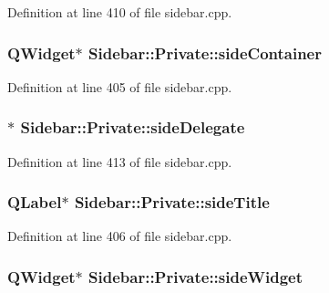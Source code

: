 Definition at line 410 of file sidebar.\+cpp.

\hypertarget{classSidebar_1_1Private_a2a3136a30630243128369d98c44b1823}{
\subsubsection[{side\+Container}]{\setlength{\rightskip}{0pt plus 5cm}Q\+Widget$\ast$ Sidebar\+::\+Private\+::side\+Container}}\label{classSidebar_1_1Private_a2a3136a30630243128369d98c44b1823}


Definition at line 405 of file sidebar.\+cpp.

\hypertarget{classSidebar_1_1Private_a25b75ddd6cbb379f77f71207ad627d54}{
\subsubsection[{side\+Delegate}]{$\ast$ Sidebar\+::\+Private\+::side\+Delegate}}\label{classSidebar_1_1Private_a25b75ddd6cbb379f77f71207ad627d54}


Definition at line 413 of file sidebar.\+cpp.

\hypertarget{classSidebar_1_1Private_a37b19515edf372e8581845c398549122}{
\subsubsection[{side\+Title}]{\setlength{\rightskip}{0pt plus 5cm}Q\+Label$\ast$ Sidebar\+::\+Private\+::side\+Title}}\label{classSidebar_1_1Private_a37b19515edf372e8581845c398549122}


Definition at line 406 of file sidebar.\+cpp.

\hypertarget{classSidebar_1_1Private_af2a5ad9bec19e907938f6eff1ade3ad9}{
\subsubsection[{side\+Widget}]{\setlength{\rightskip}{0pt plus 5cm}Q\+Widget$\ast$ Sidebar\+::\+Private\+::side\+Widget}}\label{classSidebar_1_1Private_af2a5ad9bec19e907938f6eff1ade3ad9}


